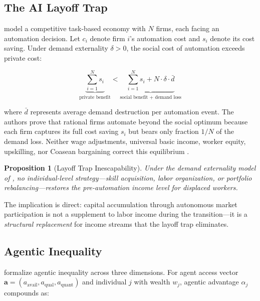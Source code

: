 \documentclass[11pt,a4paper]{article}
\newtheorem{proposition}{Proposition}[section]
\begin{document}
\subsection{The AI Layoff Trap}

\citet{hemenway2026ai} model a competitive task-based economy with $N$ firms, each facing an automation decision. Let $c_i$ denote firm $i$'s automation cost and $s_i$ denote its cost saving. Under demand externality $\delta > 0$, the social cost of automation exceeds private cost:

\begin{equation}\label{eq:demand_externality}
    \underbrace{\sum_{i=1}^{N} s_i}_{\text{private benefit}} < \underbrace{\sum_{i=1}^{N} s_i + N \cdot \delta \cdot \bar{d}}_{\text{social benefit + demand loss}}
\end{equation}

\noindent where $\bar{d}$ represents average demand destruction per automation event. The authors prove that rational firms automate beyond the social optimum because each firm captures its full cost saving $s_i$ but bears only fraction $1/N$ of the demand loss. Neither wage adjustments, universal basic income, worker equity, upskilling, nor Coasean bargaining correct this equilibrium \citep[Theorem~4]{hemenway2026ai}.

\begin{proposition}[Layoff Trap Inescapability]
\label{prop:layoff}
Under the demand externality model of \citet{hemenway2026ai}, no individual-level strategy---skill acquisition, labor organization, or portfolio rebalancing---restores the pre-automation income level for displaced workers.
\end{proposition}

The implication is direct: capital accumulation through autonomous market participation is not a supplement to labor income during the transition---it is a \emph{structural replacement} for income streams that the layoff trap eliminates.

\subsection{Agentic Inequality}

\citet{sharp2026agentic} formalize agentic inequality across three dimensions. For agent access vector $\mathbf{a} = (a_{\text{avail}}, a_{\text{qual}}, a_{\text{quant}})$ and individual $j$ with wealth $w_j$, agentic advantage $\alpha_j$ compounds as:
\end{document}
